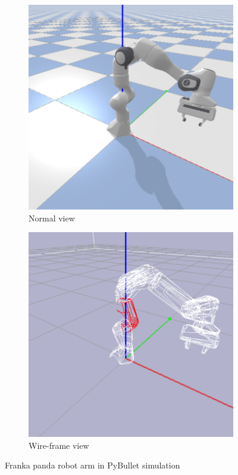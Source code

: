 \begin{figure}[h]
    \centering
    \begin{subfigure}[b]{0.45\textwidth}
        \includegraphics[width=\textwidth]{figures/robot-arm.png}
        \caption{Normal view}
        \label{fig:arm-normal}
    \end{subfigure}
    \hfill
    \begin{subfigure}[b]{0.45\textwidth}
        \includegraphics[width=\textwidth]{figures/robot-arm-wireframe.png}
        \caption{Wire-frame view}
        \label{fig:arm-wire}
    \end{subfigure}
    \caption{Franka panda robot arm in PyBullet simulation}
    \label{fig:robot-arm}
\end{figure}

